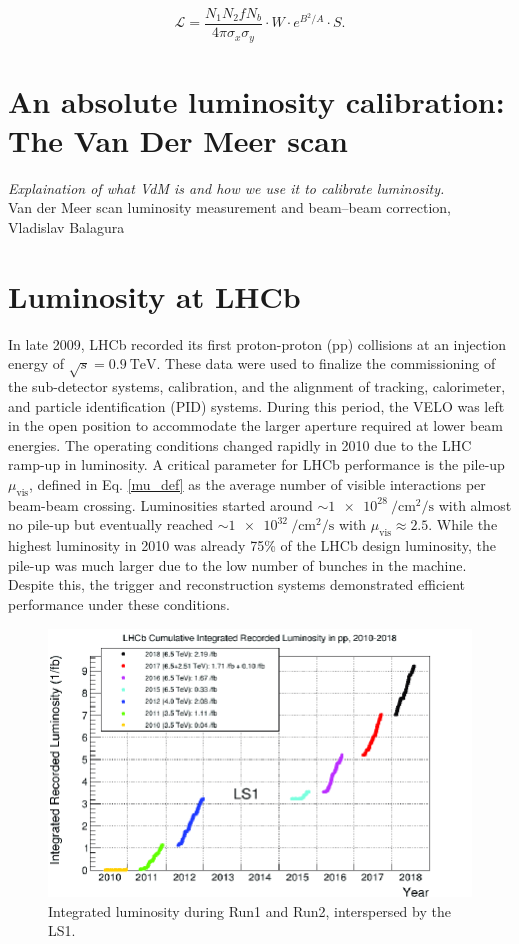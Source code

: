\begin{equation}
\mathcal{L} = \frac{N_1  N_2  f  N_b}{4 \pi  \sigma_x  \sigma_y} \cdot W \cdot e^{B^2/A} \cdot S.
\end{equation}

\section{An absolute luminosity calibration: The Van Der Meer scan}
\textit{Explaination of what VdM is and how we use it to calibrate luminosity.}\\
Van der Meer scan luminosity measurement and beam–beam correction, Vladislav Balagura



\section{Luminosity at LHCb}
In late 2009, LHCb recorded its first proton-proton (pp) collisions at an injection energy of $\sqrt{s}=\SI{0.9}{\tera\eV}$. These data were used to finalize the commissioning of the sub-detector systems, calibration, and the alignment of tracking, calorimeter, and particle identification (PID) systems. During this period, the VELO was left in the open position to accommodate the larger aperture required at lower beam energies.
The operating conditions changed rapidly in 2010 due to the LHC ramp-up in luminosity. A critical parameter for LHCb performance is the pile-up \(\mu_{\text{vis}}\), defined in Eq. \ref{mu_def} as the average number of visible interactions per beam-beam crossing. Luminosities started around $\sim \SI{1e28}{\per\centi\meter\squared\per\second}$ with almost no pile-up but eventually reached $\sim \SI{1e32}{\per\centi\meter\squared\per\second}$ with $\mu_{\text{vis}} \approx 2.5$.
While the highest luminosity in 2010 was already 75\% of the LHCb design luminosity, the pile-up was much larger due to the low number of bunches in the machine. Despite this, the trigger and reconstruction systems demonstrated efficient performance under these conditions\cite{det_perf}.

\begin{figure}
    \centering
    \includegraphics[width=\textwidth]{figures/lumiRun2.png}
    \caption{Integrated luminosity during Run1 and Run2, interspersed by the LS1.}
    \label{fig:lumiRun1Run2}
\end{figure}

